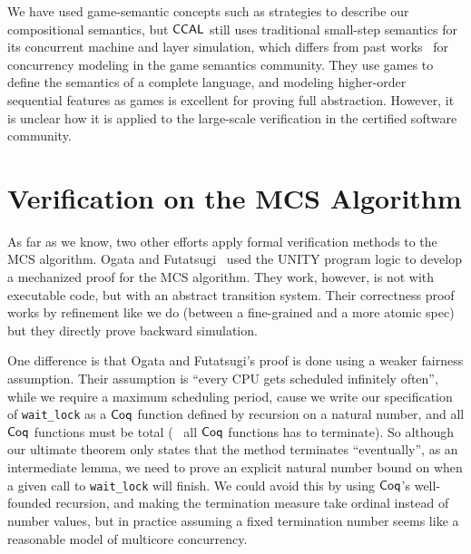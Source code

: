 
We have used
game-semantic concepts such as strategies to describe our
compositional semantics, 
but $\mathsf{CCAL}$ still uses traditional small-step semantics for its concurrent machine and layer simulation, which differs from 
past works~\cite{ghica08,nishimura13,rideau11,abramsky99}  for concurrency modeling in the game semantics community.
They use games to
define the semantics of a complete language, 
and modeling higher-order sequential features as games is excellent for proving full abstraction. 
However, it is unclear how it is applied to the large-scale verification in the certified software community.


\section{Verification on the MCS Algorithm}
\label{chatper:related:sec:verification-on-the-mcs-algorithm}

As far as we know, two other efforts apply formal verification methods
to the MCS algorithm.  Ogata and Futatsugi~\cite{ogata:mcs-lock} used the UNITY program logic to develop a mechanized proof for the MCS algorithm.
They work, however, is not with executable code, but with an abstract transition system. 
Their correctness proof works by refinement like we do (between a fine-grained
and a more atomic spec) but they directly prove backward
simulation.

One difference is that Ogata and Futatsugi's proof is
done using a weaker fairness assumption.
Their assumption is ``every CPU gets
scheduled infinitely often'', while we require a maximum scheduling
period,  cause we write our specification of \lstinline$wait_lock$ as a $\mathsf{Coq}$ function defined by recursion on a natural number, and all $\mathsf{Coq}$ functions must be total (\ie~ all $\mathsf{Coq}$ functions has to terminate). 
So although our ultimate theorem only states that the method
terminates ``eventually'', as an intermediate lemma, we need to prove an explicit natural number bound on when a given call to
\lstinline$wait_lock$ will finish.  
We could avoid this by using
$\mathsf{Coq}$'s well-founded recursion, and
making the termination measure take ordinal instead of number
values, but in practice assuming a fixed termination number seems like a reasonable
model of multicore concurrency.

